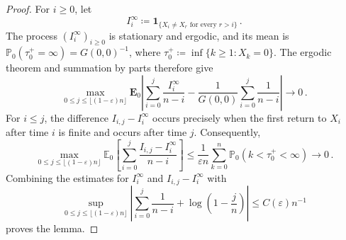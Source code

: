\documentclass[11pt]{amsart}
\theoremstyle{plain}
\theoremstyle{definition}
\newcommand{\E}{\mathbb{E}}
\renewcommand{\P}{\mathbb{P}}
\newcommand{\one}{\mathbf{1}}
\begin{document}
\begin{proof}
	For $i\geq0$, let
	\[
	I_i^\infty\coloneqq
	\one_{\{X_i\ne X_r\text{ for every }r>i\}}\, .
	\]
	The process $(I_i^\infty)_{i\geq0}$ is stationary and ergodic, and its
	mean is $\P_0(\tau_0^+=\infty)=G(0,0)^{-1}$, where
	$\tau_0^+\coloneqq\inf\{k\geq1:X_k=0\}$. The ergodic theorem and summation by parts
	therefore give
	\[
	\max_{0\leq j\leq\lfloor(1-\varepsilon)n\rfloor}
	\mathbf E_0\left|
	\sum_{i=0}^j\frac{I_i^\infty}{n-i}
	-\frac1{G(0,0)}\sum_{i=0}^j\frac1{n-i}
	\right|\longrightarrow0\, .
	\]
	For $i\leq j$, the difference $I_{i,j}-I_i^\infty$ occurs precisely when
	the first return to $X_i$ after time $i$ is finite and occurs after time $j$.
	Consequently,
	\[
	\max_{0\leq j\leq\lfloor(1-\varepsilon)n\rfloor}
	\E_0\left[
	\sum_{i=0}^j\frac{I_{i,j}-I_i^\infty}{n-i}
	\right]
	\leq
	\frac1{\varepsilon n}\sum_{k=0}^n
	\P_0(k<\tau_0^+<\infty)
	\longrightarrow0\, .
	\]
	Combining the estimates for $I_i^\infty$ and $I_{i,j}-I_i^\infty$
	with
	\[
	\sup_{0\leq j\leq\lfloor(1-\varepsilon)n\rfloor}
	\left|\sum_{i=0}^j\frac1{n-i}
	+\log\left(1-\frac jn\right)\right|
	\leq C(\varepsilon)n^{-1}
	\]
	proves the lemma.
\end{proof}
\end{document}
